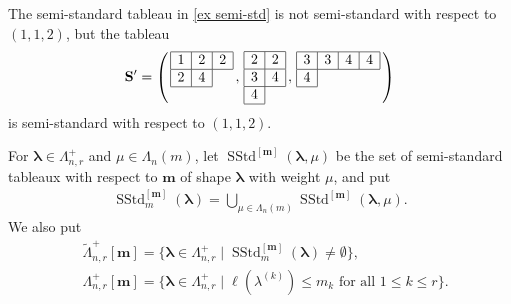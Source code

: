 \documentclass[12pt]{amsart}
\numberwithin{equation}{thm}
\newcommand\bS{\mathbf S}
\renewcommand\bm{\mathbf m} %
\newcommand\la{\lambda}
\newcommand\vL{\varLambda}
\newcommand\Bla{\boldsymbol\lambda}
\newcommand\wt{\widetilde}
\newcommand{\SStd}{\operatorname{SStd}}
\begin{document}
The semi-standard tableau in \eqref{ex semi-std} is not semi-standard with respect to $(1,1,2)$, 
but the tableau 
\begin{align*}
\bS'= \left( \, \begin{array}{|c|c|c|} \hline 1 & 2 & 2 \\ \hline 2 & 4 \\ \cline{1-2} \multicolumn{1}{c}{} \end{array} \, , 
	\, 
	\begin{array}{|c|c|c|} \hline 2 & 2 \\ \hline 3 & 4 \\ \hline 4 \\ \cline{1-1} \end{array} \, , 
	\, 
	\begin{array}{|c|c|c|c|} \hline 3 & 3 & 4 & 4 \\ \hline 4 \\ \cline{1-1} \multicolumn{1}{c}{} \end{array} 
	\, 
	\right) 
\end{align*}
is semi-standard with respect to $(1,1,2)$. 


For $\Bla \in \vL_{n,r}^+$ and $\mu \in \vL_n(m)$,  
let $\SStd^{[\bm]}(\Bla,\mu)$ be the set of semi-standard tableaux with respect to $\bm$ 
of shape $\Bla$ with weight $\mu$, 
and put 
\begin{align*}
\SStd_m^{[\bm]} (\Bla) = \bigcup_{\mu \in \vL_n(m)} \SStd^{[\bm]} (\Bla, \mu).
\end{align*}  
We also put 
\begin{align*}
&\wt{\vL}_{n,r}^+[\bm] = \{ \Bla \in \vL_{n,r}^+ \mid \SStd_m^{[\bm]} (\Bla) \not=\emptyset \}, 
\\
&\vL_{n,r}^+[\bm] = \{\Bla \in \vL_{n,r}^+ \mid \ell (\la^{(k)}) \leq m_k \text{ for all } 1  \leq k \leq r\}.
\end{align*}
\end{document}
